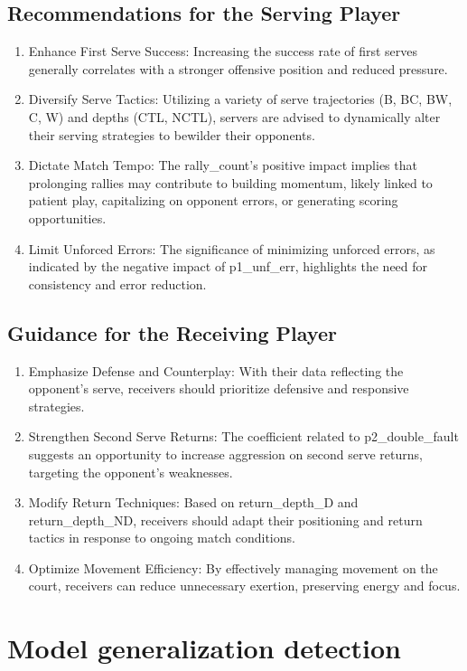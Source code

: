 \documentclass[12pt]{article}  %
\begin{document}
\subsection*{Recommendations for the Serving Player}
\begin{enumerate}
    \item Enhance First Serve Success: Increasing the success rate of first serves generally correlates with a stronger offensive position and reduced pressure.
    \item Diversify Serve Tactics: Utilizing a variety of serve trajectories (B, BC, BW, C, W) and depths (CTL, NCTL), servers are advised to dynamically alter their serving strategies to bewilder their opponents.
    \item Dictate Match Tempo: The rally\_count's positive impact implies that prolonging rallies may contribute to building momentum, likely linked to patient play, capitalizing on opponent errors, or generating scoring opportunities.
    \item Limit Unforced Errors: The significance of minimizing unforced errors, as indicated by the negative impact of p1\_unf\_err, highlights the need for consistency and error reduction.
\end{enumerate}

\subsection*{Guidance for the Receiving Player}
\begin{enumerate}
    \item Emphasize Defense and Counterplay: With their data reflecting the opponent's serve, receivers should prioritize defensive and responsive strategies.
    \item Strengthen Second Serve Returns: The coefficient related to p2\_double\_fault suggests an opportunity to increase aggression on second serve returns, targeting the opponent's weaknesses.
    \item Modify Return Techniques: Based on return\_depth\_D and return\_depth\_ND, receivers should adapt their positioning and return tactics in response to ongoing match conditions.
    \item Optimize Movement Efficiency: By effectively managing movement on the court, receivers can reduce unnecessary exertion, preserving energy and focus.
\end{enumerate}
\section{Model generalization detection}
\end{document}
